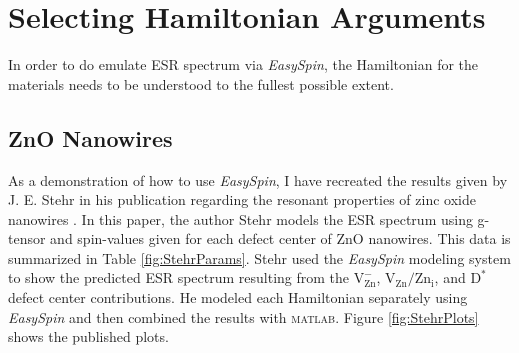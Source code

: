 \documentclass[oneside, noacknowlegments]{BYUPhys}
\begin{document}
\section{Selecting Hamiltonian Arguments}

In order to do emulate ESR spectrum via \textit{EasySpin}, the Hamiltonian for the materials needs to be understood to the fullest possible extent.

\subsection{ZnO Nanowires}
 
As a demonstration of how to use \textit{EasySpin}, I have recreated the results given by J. E. Stehr in his publication regarding the resonant properties of zinc oxide nanowires \cite{RefWorks:doc:58929128e4b0228a292928a7}. In this paper, the author Stehr models the ESR spectrum using g-tensor and spin-values given for each defect center of ZnO nanowires. This data is summarized in Table \ref{fig:StehrParams}. Stehr used the \textit{EasySpin} modeling system to show the predicted ESR spectrum resulting from the $\text{V}_{\text{Zn}}^{-}$, $\text{V}_{\text{Zn}}/\text{Zn}_{\text{i}}$, and $\text{D}^{*}$ defect center contributions. He modeled each Hamiltonian separately using \textit{EasySpin} and then combined the results with \textsc{matlab}. Figure \ref{fig:StehrPlots} shows the published plots.
\end{document}
